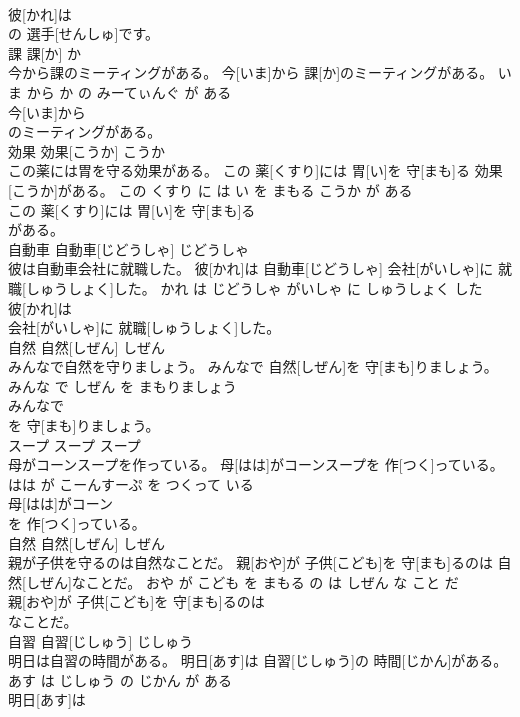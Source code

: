 \documentclass[8pt]{extreport}
\begin{document}
\begin{CJK}{UTF8}{min}
\\	彼[かれ]は
\\	の 選手[せんしゅ]です。			
\\	課	課[か]	か	
\\	今から課のミーティングがある。	今[いま]から 課[か]のミーティングがある。	いま から か の みーてぃんぐ が ある	
\\	今[いま]から
\\	のミーティングがある。			
\\	効果	効果[こうか]	こうか	
\\	この薬には胃を守る効果がある。	この 薬[くすり]には 胃[い]を 守[まも]る 効果[こうか]がある。	この くすり に は い を まもる こうか が ある	
\\	この 薬[くすり]には 胃[い]を 守[まも]る
\\	がある。			
\\	自動車	自動車[じどうしゃ]	じどうしゃ	
\\	彼は自動車会社に就職した。	彼[かれ]は 自動車[じどうしゃ] 会社[がいしゃ]に 就職[しゅうしょく]した。	かれ は じどうしゃ がいしゃ に しゅうしょく した	
\\	彼[かれ]は
\\	会社[がいしゃ]に 就職[しゅうしょく]した。			
\\	自然	自然[しぜん]	しぜん	
\\	みんなで自然を守りましょう。	みんなで 自然[しぜん]を 守[まも]りましょう。	みんな で しぜん を まもりましょう	
\\	みんなで
\\	を 守[まも]りましょう。			
\\	スープ	スープ	スープ	
\\	母がコーンスープを作っている。	母[はは]がコーンスープを 作[つく]っている。	はは が こーんすーぷ を つくって いる	
\\	母[はは]がコーン
\\	を 作[つく]っている。			
\\	自然	自然[しぜん]	しぜん	
\\	親が子供を守るのは自然なことだ。	親[おや]が 子供[こども]を 守[まも]るのは 自然[しぜん]なことだ。	おや が こども を まもる の は しぜん な こと だ	
\\	親[おや]が 子供[こども]を 守[まも]るのは
\\	なことだ。			
\\	自習	自習[じしゅう]	じしゅう	
\\	明日は自習の時間がある。	明日[あす]は 自習[じしゅう]の 時間[じかん]がある。	あす は じしゅう の じかん が ある	
\\	明日[あす]は

\end{CJK}
\end{document}
